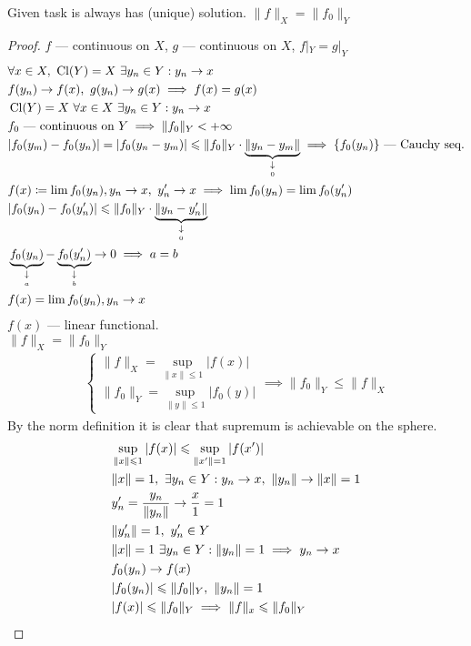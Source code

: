\begin{thm}
  Given task is always has (unique) solution. $\|f\|_X = \|f_0\|_Y$
\end{thm}

\begin{proof}
  $f$ --- continuous on $X$, $g$ --- continuous on $X$, $f|_Y = g|_Y$
  \begin{align*}
    &\forall x \in X,\ \cl{Y} = X\ \exists y_n \in Y : y_n \to x \\
    &f(y_n) \to f(x),\ g(y_n) \to g(x) \implies f(x) = g(x) \\
    &\cl{Y} = X\ \forall x \in X\ \exists y_n \in Y : y_n \to x\\
    &f_0\ \text{--- continuous on}\ Y \implies \|f_0\|_Y < +\infty \\
    &|f_0(y_m) - f_0(y_n)| = |f_0(y_n - y_m)| \leq \|f_0\|_Y \cdot \tendsto{\|y_n - y_m\|}{0} \implies \{f_0(y_n)\}\ \text{--- Cauchy seq.} \\
    &f(x) \coloneqq \lim f_0(y_n), y_n \to x,\ y_n' \to x \implies \lim f_0(y_n) = \lim f_0(y_n') \\
    &|f_0(y_n) - f_0(y_n')| \leq \|f_0\|_Y \cdot \tendsto{\|y_n - y_n'\|}{0} \\
    &\tendsto{f_0(y_n)}{a} - \tendsto{f_0(y_n')}{b} \to 0 \implies a = b \\
    &f(x) = \lim f_0(y_n), y_n \to x
  \end{align*}
  $f(x)$ --- linear functional. \\
  $\|f\|_X = \|f_0\|_Y$
  \begin{align*}
    \begin{cases}
      \|f\|_X = \sup\limits_{\|x\| \leq 1} |f(x)| \\
      \|f_0\|_Y = \sup\limits_{\|y\| \leq 1} |f_0(y)|
    \end{cases}
        \implies \|f_0\|_Y \leq \|f\|_X
  \end{align*}
  By the norm definition it is clear that supremum is achievable on the sphere.
  \begin{align*}
    &\sup_{\|x\| \leq 1}|f(x)| \leq \sup_{\|x'\| = 1} |f(x')| \\
    &\|x\| = 1,\ \exists y_n \in Y : y_n \to x,\ \|y_n\| \to \|x\| = 1 \\
    &y_n' = \dfrac{y_n}{\|y_n\|} \to \dfrac x1 = 1 \\
    &\|y_n'\| = 1,\ y_n' \in Y \\
    &\|x\| = 1\ \exists y_n \in Y : \|y_n\| = 1 \implies y_n \to x \\
    &f_0(y_n) \to f(x) \\
    &|f_0(y_n)| \leq \|f_0\|_Y,\ \|y_n\| = 1 \\
    &|f(x)| \leq \|f_0\|_Y \implies \|f\|_x \leq \|f_0\|_Y \qedhere 
  \end{align*}
\end{proof}

